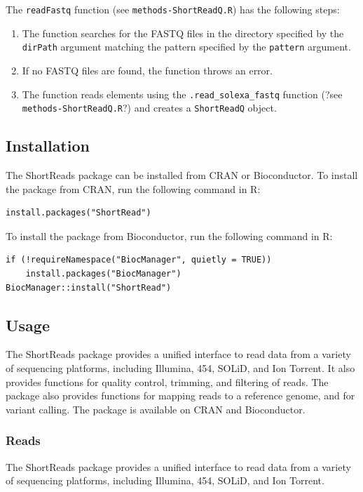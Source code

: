 \documentclass[12pt]{article}
\begin{document}
The \texttt{readFastq} function (see \texttt{methods-ShortReadQ.R}) has the following steps:
\begin{enumerate}
    \item The function searches for the FASTQ files in the directory specified by the \texttt{dirPath} argument matching the pattern specified by the \texttt{pattern} argument.
    \item If no FASTQ files are found, the function throws an error.
    \item The function reads elements using the \texttt{.read\_solexa\_fastq} function (?see \texttt{methods-ShortReadQ.R}?) and creates a \texttt{ShortReadQ} object.
\end{enumerate}



\subsection{Installation}
The ShortReads package can be installed from CRAN or Bioconductor. To install the package from CRAN, run the following command in R:
\begin{verbatim}
install.packages("ShortRead")
\end{verbatim}
To install the package from Bioconductor, run the following command in R:
\begin{verbatim}
if (!requireNamespace("BiocManager", quietly = TRUE))
    install.packages("BiocManager")
BiocManager::install("ShortRead")
\end{verbatim}

\subsection{Usage}
The ShortReads package provides a unified interface to read data from a variety of sequencing platforms,
including Illumina, 454, SOLiD, and Ion Torrent.
It also provides functions for quality control, trimming, and filtering of reads.
The package also provides functions for mapping reads to a reference genome, and for variant calling.
The package is available on CRAN and Bioconductor.

\subsubsection{Reads}
The ShortReads package provides a unified interface to read data from a variety of sequencing platforms, including Illumina, 454, SOLiD, and Ion Torrent.
\end{document}
